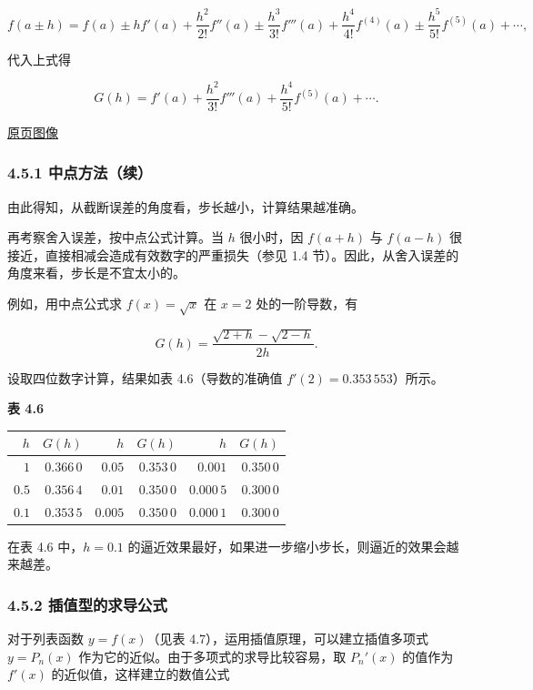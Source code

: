 \documentclass[
  10pt,
  fontset=fandol]{ctexart}
\newcounter{none} %
\begin{document}
\[
f(a\pm h)=f(a)\pm hf'(a)+\frac{h^2}{2!}f''(a)
\pm\frac{h^3}{3!}f'''(a)+\frac{h^4}{4!}f^{(4)}(a)
\pm\frac{h^5}{5!}f^{(5)}(a)+\cdots,
\]

代入上式得

\[
G(h)=f'(a)+\frac{h^2}{3!}f'''(a)+\frac{h^4}{5!}f^{(5)}(a)+\cdots.
\]

\href{../../source-images/pdf-113.jpeg}{原页图像}

\subsubsection{4.5.1 中点方法（续）}\label{ux4e2dux70b9ux65b9ux6cd5ux7eed}

由此得知，从截断误差的角度看，步长越小，计算结果越准确。

再考察舍入误差，按中点公式计算。当 \(h\) 很小时，因 \(f(a+h)\) 与 \(f(a-h)\) 很接近，直接相减会造成有效数字的严重损失（参见 1.4 节）。因此，从舍入误差的角度来看，步长是不宜太小的。

例如，用中点公式求 \(f(x)=\sqrt{x}\) 在 \(x=2\) 处的一阶导数，有

\[
G(h)=\frac{\sqrt{2+h}-\sqrt{2-h}}{2h}.
\]

设取四位数字计算，结果如表 4.6（导数的准确值 \(f'(2)=0.353\,553\)）所示。

\textbf{表 4.6}

{\def\LTcaptype{none} %
\begin{longtable}[]{@{}rrrrrr@{}}
\toprule\noalign{}
\(h\) & \(G(h)\) & \(h\) & \(G(h)\) & \(h\) & \(G(h)\) \\
\midrule\noalign{}
\endhead
\bottomrule\noalign{}
\endlastfoot
\(1\) & \(0.366\,0\) & \(0.05\) & \(0.353\,0\) & \(0.001\) & \(0.350\,0\) \\
\(0.5\) & \(0.356\,4\) & \(0.01\) & \(0.350\,0\) & \(0.000\,5\) & \(0.300\,0\) \\
\(0.1\) & \(0.353\,5\) & \(0.005\) & \(0.350\,0\) & \(0.000\,1\) & \(0.300\,0\) \\
\end{longtable}
}

在表 4.6 中，\(h=0.1\) 的逼近效果最好，如果进一步缩小步长，则逼近的效果会越来越差。

\subsubsection{4.5.2 插值型的求导公式}\label{ux63d2ux503cux578bux7684ux6c42ux5bfcux516cux5f0f}

对于列表函数 \(y=f(x)\)（见表 4.7），运用插值原理，可以建立插值多项式 \(y=P_n(x)\) 作为它的近似。由于多项式的求导比较容易，取 \(P_n'(x)\) 的值作为 \(f'(x)\) 的近似值，这样建立的数值公式
\end{document}
